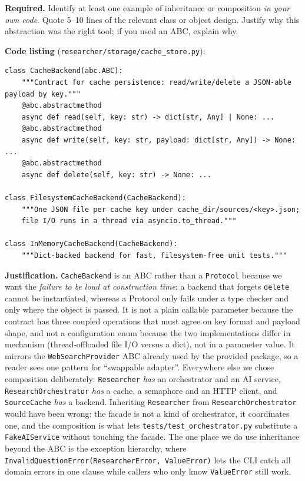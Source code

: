 \documentclass[11pt,a4paper]{article}
\begin{document}
\begin{deliverbox}
\textbf{Required.} Identify at least one example of inheritance or composition \emph{in your own code}. Quote 5--10 lines of the relevant class or object design. Justify why this abstraction was the right tool; if you used an ABC, explain why.
\end{deliverbox}

\textbf{Code listing} (\texttt{researcher/storage/cache\_store.py}):
\begin{lstlisting}[style=python]
class CacheBackend(abc.ABC):
    """Contract for cache persistence: read/write/delete a JSON-able payload by key."""
    @abc.abstractmethod
    async def read(self, key: str) -> dict[str, Any] | None: ...
    @abc.abstractmethod
    async def write(self, key: str, payload: dict[str, Any]) -> None: ...
    @abc.abstractmethod
    async def delete(self, key: str) -> None: ...

class FilesystemCacheBackend(CacheBackend):
    """One JSON file per cache key under cache_dir/sources/<key>.json;
    file I/O runs in a thread via asyncio.to_thread."""

class InMemoryCacheBackend(CacheBackend):
    """Dict-backed backend for fast, filesystem-free unit tests."""
\end{lstlisting}

\textbf{Justification.} \texttt{CacheBackend} is an ABC rather than a \texttt{Protocol} because we want the \emph{failure to be loud at construction time}: a backend that forgets \texttt{delete} cannot be instantiated, whereas a Protocol only fails under a type checker and only where the object is passed. It is not a plain callable parameter because the contract has three coupled operations that must agree on key format and payload shape, and not a configuration enum because the two implementations differ in mechanism (thread-offloaded file I/O versus a dict), not in a parameter value. It mirrors the \texttt{WebSearchProvider} ABC already used by the provided package, so a reader sees one pattern for ``swappable adapter''. Everywhere else we chose composition deliberately: \texttt{Researcher} \emph{has} an orchestrator and an AI service, \texttt{ResearchOrchestrator} \emph{has} a cache, a semaphore and an HTTP client, and \texttt{SourceCache} \emph{has} a backend. Inheriting \texttt{Researcher} from \texttt{ResearchOrchestrator} would have been wrong: the facade is not a kind of orchestrator, it coordinates one, and the composition is what lets \texttt{tests/test\_orchestrator.py} substitute a \texttt{FakeAIService} without touching the facade. The one place we do use inheritance beyond the ABC is the exception hierarchy, where \texttt{InvalidQuestionError(ResearcherError, ValueError)} lets the CLI catch all domain errors in one clause while callers who only know \texttt{ValueError} still work.
\end{document}
